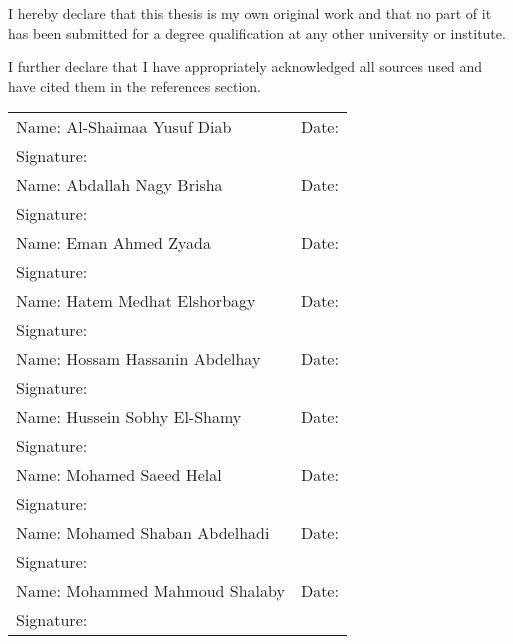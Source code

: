 I hereby declare that this thesis is my own original work and that no part of it has been submitted for a degree qualification at any other university or institute.


I further declare that I have appropriately acknowledged all sources used and have cited them in the references section.
\begin{table}[H]
\begin{tabular}{p{4in} l}
\\
Name: Al-Shaimaa Yusuf Diab  & Date:\\   %
Signature:              &    %
\\[1cm]
Name: Abdallah Nagy Brisha  & Date:\\   %
Signature:              &   %
\\[1cm]
Name: Eman Ahmed Zyada  & Date:\\   %
Signature:              &    %
\\[1cm]
Name: Hatem Medhat Elshorbagy  & Date:\\   %
Signature:              &   %
\\[1cm]
Name: Hossam Hassanin Abdelhay  & Date:\\   %
Signature:              &    %
\\[1cm]
Name: Hussein Sobhy El-Shamy  & Date:\\   %
Signature:              &   %
\\[1cm]
Name: Mohamed Saeed Helal  & Date:\\   %
Signature:              &    %
\\[1cm]
Name: Mohamed Shaban Abdelhadi  & Date:\\   %
Signature:              &   %
\\[1cm]
Name: Mohammed Mahmoud Shalaby  & Date:\\   %
Signature:              &    %
\\[1cm]
\end{tabular}
\end{table}
